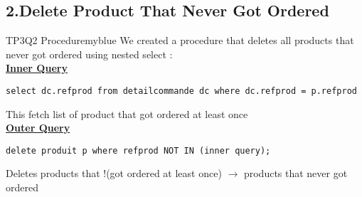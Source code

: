 \newpage
\subsection*{2.Delete Product That Never Got Ordered}


\begin{prettyBox}{TP3Q2 Procedure}{myblue}
We created a procedure that deletes all products that never got ordered using nested select :\\[0.15cm]
\textbf{\underline{Inner Query}}
\begin{lstlisting}
select dc.refprod from detailcommande dc where dc.refprod = p.refprod
\end{lstlisting}
This fetch list of product that got ordered at least once\\[0.15cm]
\textbf{\underline{Outer Query}}
\begin{lstlisting}
delete produit p where refprod NOT IN (inner query); 
\end{lstlisting}
Deletes products that !(got ordered at least once) \(\rightarrow\) products that never got ordered
\end{prettyBox}
